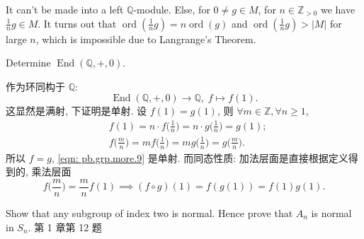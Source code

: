\begin{solution}
    It can't be made into a left $\mathbb{Q}$-module. Else, for $0\neq g\in M$, for $n\in\mathbb{Z}_{>0}$ we have $\frac{1}{n}g\in M$. 
    It turns out that $\operatorname{ord}(\frac{1}{n}g)=n \operatorname{ord}(g)$ and $\operatorname{ord}(\frac{1}{n}g)>|M|$ for large $n$, 
    which is impossible due to Langrange's Theorem.
\end{solution}

    
\setcounter{pb}{10}
\begin{problem}
    Determine $\operatorname{End}(\mathbb{Q},+,0)$.
\end{problem}

\begin{solution}
    作为环同构于 $\mathbb{Q}$:
        \begin{equation}
            \label{eqn: pb.grp.more.9}
            \operatorname{End}(\mathbb{Q},+,0) \to \mathbb{Q},\; f\mapsto f(1). 
        \end{equation}
    这显然是满射, 下证明是单射. 设 $f(1)=g(1)$, 则 $\forall m\in\mathbb{Z},\forall n\geq1  $, 
        \[
            \begin{split}
                & f(1)=n\cdot f\Big(\frac{1}{n}\Big)=n\cdot g\Big(\frac{1}{n}\Big)=g(1);\\
                & f\Big(\frac{m}{n}\Big)=m f\Big(\frac{1}{n}\Big)=m g\Big(\frac{1}{n}\Big)=g\Big(\frac{m}{n}\Big).
            \end{split}
        \]
    所以 $f=g$, \eqref{eqn: pb.grp.more.9} 是单射. 而同态性质: 加法层面是直接根据定义得到的, 乘法层面
        \[
            f\Big(\frac{m}{n}\Big)=\frac{m}{n}f(1)\implies(f\circ g)(1)=f( g(1) )=f(1) g(1).
        \]
\end{solution}

\setcounter{pb}{11}

\begin{problem}
    Show that any subgroup of index two is normal. Hence prove that
    $A_n$ is normal in $S_n$. 第 1 章第 12 题
\end{problem}

